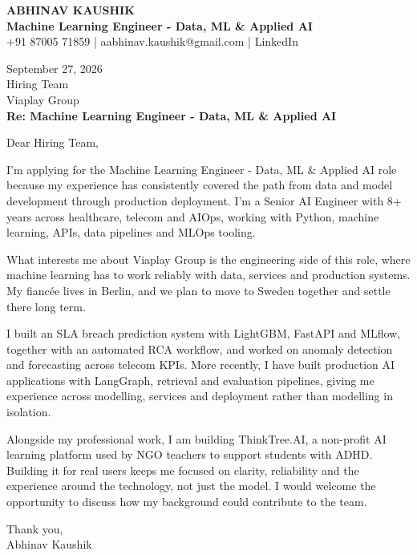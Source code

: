 \documentclass[10pt,a4paper]{article}
\begin{document}
\begin{center}
{\Large\bfseries ABHINAV KAUSHIK}\\[2pt]
{\bfseries Machine Learning Engineer - Data, ML \& Applied AI}\\[2pt]
+91 87005 71859 \quad | \quad aabhinav.kaushik@gmail.com \quad | \quad LinkedIn
\end{center}
\vspace{8pt}
September 27, 2026\\[6pt]
Hiring Team\\
Viaplay Group\\[4pt]
\textbf{Re: Machine Learning Engineer - Data, ML \& Applied AI}

Dear Hiring Team,

I’m applying for the Machine Learning Engineer - Data, ML \& Applied AI role because my experience has consistently covered the path from data and model development through production deployment. I’m a Senior AI Engineer with 8+ years across healthcare, telecom and AIOps, working with Python, machine learning, APIs, data pipelines and MLOps tooling.

What interests me about Viaplay Group is the engineering side of this role, where machine learning has to work reliably with data, services and production systems. My fiancée lives in Berlin, and we plan to move to Sweden together and settle there long term.

I built an SLA breach prediction system with LightGBM, FastAPI and MLflow, together with an automated RCA workflow, and worked on anomaly detection and forecasting across telecom KPIs. More recently, I have built production AI applications with LangGraph, retrieval and evaluation pipelines, giving me experience across modelling, services and deployment rather than modelling in isolation.

Alongside my professional work, I am building ThinkTree.AI, a non-profit AI learning platform used by NGO teachers to support students with ADHD. Building it for real users keeps me focused on clarity, reliability and the experience around the technology, not just the model. I would welcome the opportunity to discuss how my background could contribute to the team.

Thank you,\\
Abhinav Kaushik
\end{document}
